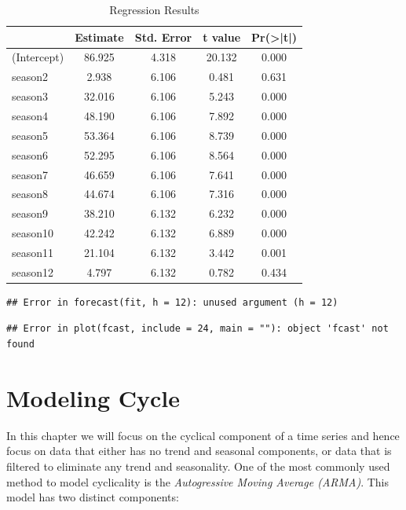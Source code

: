 \documentclass[]{book}
\theoremstyle{definition}
\theoremstyle{definition}
\theoremstyle{definition}
\theoremstyle{remark}
\begin{document}
\begin{table}[t]

\caption{\label{tab:ch5-table3}Regression Results}
\centering
\begin{tabular}{lcccc}
\toprule
  & Estimate & Std. Error & t value & Pr(>|t|)\\
\midrule
(Intercept) & 86.925 & 4.318 & 20.132 & 0.000\\
season2 & 2.938 & 6.106 & 0.481 & 0.631\\
season3 & 32.016 & 6.106 & 5.243 & 0.000\\
season4 & 48.190 & 6.106 & 7.892 & 0.000\\
season5 & 53.364 & 6.106 & 8.739 & 0.000\\
\addlinespace
season6 & 52.295 & 6.106 & 8.564 & 0.000\\
season7 & 46.659 & 6.106 & 7.641 & 0.000\\
season8 & 44.674 & 6.106 & 7.316 & 0.000\\
season9 & 38.210 & 6.132 & 6.232 & 0.000\\
season10 & 42.242 & 6.132 & 6.889 & 0.000\\
\addlinespace
season11 & 21.104 & 6.132 & 3.442 & 0.001\\
season12 & 4.797 & 6.132 & 0.782 & 0.434\\
\bottomrule
\end{tabular}
\end{table}

\begin{verbatim}
## Error in forecast(fit, h = 12): unused argument (h = 12)
\end{verbatim}

\begin{verbatim}
## Error in plot(fcast, include = 24, main = ""): object 'fcast' not found
\end{verbatim}

\hypertarget{modeling-cycle}{%
\chapter{Modeling Cycle}\label{modeling-cycle}}

In this chapter we will focus on the cyclical component of a time series and hence focus on data that either has no trend and seasonal components, or data that is filtered to eliminate any trend and seasonality. One of the most commonly used method to model cyclicality is the \emph{Autogressive Moving Average (ARMA)}. This model has two distinct components:
\end{document}
